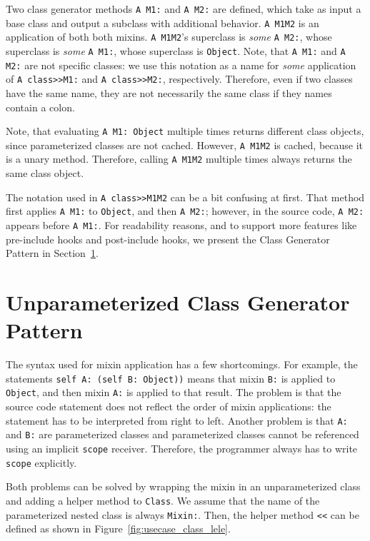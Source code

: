 Two class generator methods \texttt{A M1:} and \texttt{A M2:} are defined, which take as input a base class and output a subclass with additional behavior. \texttt{A M1M2} is an application of both both mixins. \texttt{A M1M2}'s superclass is \emph{some} \texttt{A M2:}, whose superclass is \emph{some} \texttt{A M1:}, whose superclass is \texttt{Object}. Note, that \texttt{A M1:} and \texttt{A M2:} are not specific classes: we use this notation as a name for \emph{some} application of \texttt{A class>>M1:} and \texttt{A class>>M2:}, respectively. Therefore, even if two classes have the same name, they are not necessarily the same class if they names contain a colon.

Note, that evaluating \texttt{A M1: Object} multiple times returns different class objects, since parameterized classes are not cached. However, \texttt{A M1M2} is cached, because it is a unary method. Therefore, calling \texttt{A M1M2} multiple times always returns the same class object.

The notation used in \texttt{A class>>M1M2} can be a bit confusing at first. That method first applies \texttt{A M1:} to \texttt{Object}, and then \texttt{A M2:}; however, in the source code, \texttt{A M2:} appears before \texttt{A M1:}. For readability reasons, and to support more features like pre-include hooks and post-include hooks, we present the Class Generator Pattern in Section~\ref{sec:usecase_classgen}.

\section{Unparameterized Class Generator Pattern}
\label{sec:usecase_classgen}
The syntax used for mixin application has a few shortcomings. For example, the statements \texttt{self A: (self B: Object))} means that mixin \texttt{B:} is applied to \texttt{Object}, and then mixin \texttt{A:} is applied to that result. The problem is that the source code statement does not reflect the order of mixin applications: the statement has to be interpreted from right to left. Another problem is that \texttt{A:} and \texttt{B:} are parameterized classes and parameterized classes cannot be referenced using an implicit \texttt{scope} receiver. Therefore, the programmer always has to write \texttt{scope} explicitly.

Both problems can be solved by wrapping the mixin in an unparameterized class and adding a helper method to \texttt{Class}. We assume that the name of the parameterized nested class is always \texttt{Mixin:}. Then, the helper method \texttt{<<} can be defined as shown in Figure~\ref{fig:usecase_class_lele}.

